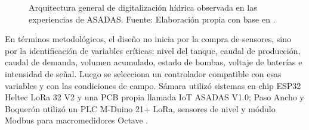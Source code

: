 \documentclass[12pt,letterpaper]{article}
\begin{document}
\begin{figure}[htbp]
  \centering
  \caption{Arquitectura general de digitalización hídrica observada en las experiencias de ASADAS. Fuente: Elaboración propia con base en \cite{solorzano2021,oviedo2024}.}
  \label{fig:arquitectura_general}
\end{figure}

En términos metodológicos, el diseño no inicia por la compra de sensores, sino por la identificación de variables críticas: nivel del tanque, caudal de producción, caudal de demanda, volumen acumulado, estado de bombas, voltaje de baterías e intensidad de señal. Luego se selecciona un controlador compatible con esas variables y con las condiciones de campo. Sámara utilizó sistemas en chip ESP32 Heltec LoRa 32 V2 y una PCB propia llamada IoT ASADAS V1.0; Paso Ancho y Boquerón utilizó un PLC M-Duino 21+ LoRa, sensores de nivel y módulo Modbus para macromedidores Octave \cite{solorzano2021,oviedo2024}.
\end{document}
